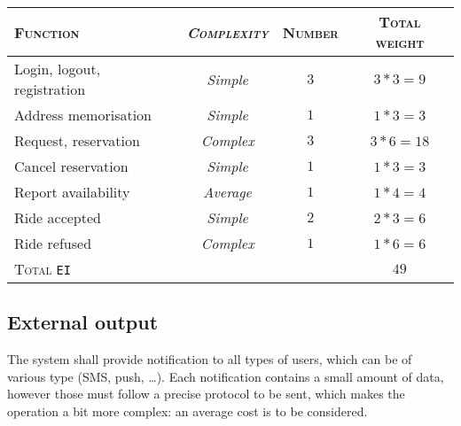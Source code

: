 \begin{table*}\begin{tabularx}{\textwidth}{ X >{\itshape}C{\myWFP} C{\myWFP} C{\myWFP} }

\toprule
	
	\normalfont\textsc{Function} &
	\normalfont\textsc{Complexity}	& 
	\normalfont\textsc{Number} &
	\normalfont\textsc{Total weight} \\

\toprule

	Login, logout, registration	& Simple		& $ 3 $		& $ 3*3 = 9 $ \\
\midrule
	Address memorisation			& Simple		& $ 1 $		& $ 1*3 = 3 $ \\
\midrule
	Request, reservation			& Complex	& $ 3 $		& $ 3*6 = 18 $ \\
\midrule
	Cancel reservation			& Simple		& $ 1 $ 		& $ 1*3 = 3 $ \\
\midrule
	Report availability			& Average	& $ 1 $ 		& $ 1*4 = 4 $ \\
\midrule
	Ride accepted				& Simple		& $ 2 $ 		& $ 2*3 = 6 $ \\
\midrule
	Ride refused				& Complex	& $ 1 $ 		& $ 1*6 = 6 $ \\

\bottomrule

\normalfont\textsc{Total} \texttt{EI} && & $ 49 $ \\

\bottomrule


\end{tabularx}\end{table*}










\subsection*{External output}


The system shall provide notification to all types of users, which can be of various type (SMS, push, \dots). Each notification contains a small amount of data, however those must follow a precise protocol to be sent, which makes the operation a bit more complex: an average cost is to be considered.



